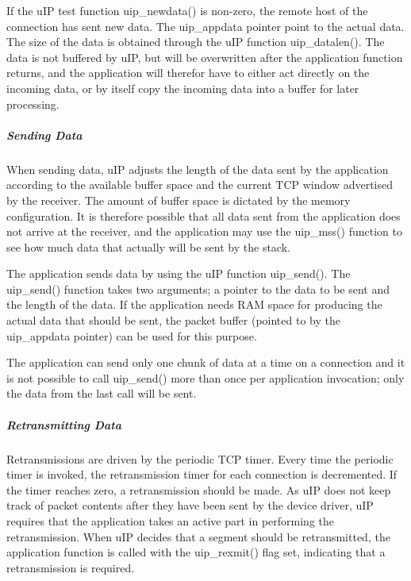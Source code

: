 \-If the u\-I\-P test function uip\-\_\-newdata() is non-\/zero, the remote host of the connection has sent new data. \-The uip\-\_\-appdata pointer point to the actual data. \-The size of the data is obtained through the u\-I\-P function uip\-\_\-datalen(). \-The data is not buffered by u\-I\-P, but will be overwritten after the application function returns, and the application will therefor have to either act directly on the incoming data, or by itself copy the incoming data into a buffer for later processing.\hypertarget{a00060_senddata}{}\subparagraph{\-Sending Data}\label{a00060_senddata}
\-When sending data, u\-I\-P adjusts the length of the data sent by the application according to the available buffer space and the current \-T\-C\-P window advertised by the receiver. \-The amount of buffer space is dictated by the memory configuration. \-It is therefore possible that all data sent from the application does not arrive at the receiver, and the application may use the uip\-\_\-mss() function to see how much data that actually will be sent by the stack.

\-The application sends data by using the u\-I\-P function uip\-\_\-send(). \-The uip\-\_\-send() function takes two arguments; a pointer to the data to be sent and the length of the data. \-If the application needs \-R\-A\-M space for producing the actual data that should be sent, the packet buffer (pointed to by the uip\-\_\-appdata pointer) can be used for this purpose.

\-The application can send only one chunk of data at a time on a connection and it is not possible to call uip\-\_\-send() more than once per application invocation; only the data from the last call will be sent.\hypertarget{a00060_rexmitdata}{}\subparagraph{\-Retransmitting Data}\label{a00060_rexmitdata}
\-Retransmissions are driven by the periodic \-T\-C\-P timer. \-Every time the periodic timer is invoked, the retransmission timer for each connection is decremented. \-If the timer reaches zero, a retransmission should be made. \-As u\-I\-P does not keep track of packet contents after they have been sent by the device driver, u\-I\-P requires that the application takes an active part in performing the retransmission. \-When u\-I\-P decides that a segment should be retransmitted, the application function is called with the uip\-\_\-rexmit() flag set, indicating that a retransmission is required.

